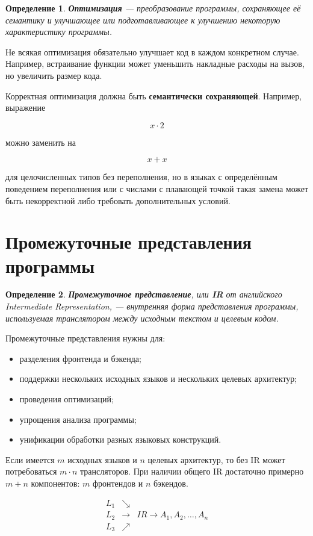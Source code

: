 \documentclass[12pt,a4paper]{article}
\newtheorem{definition}{Определение}
\begin{document}
\begin{definition}
\textbf{Оптимизация} --- преобразование программы, сохраняющее её семантику и улучшающее или подготавливающее к улучшению некоторую характеристику программы.
\end{definition}

Не всякая оптимизация обязательно улучшает код в каждом конкретном случае. Например, встраивание функции может уменьшить накладные расходы на вызов, но увеличить размер кода.

Корректная оптимизация должна быть \textbf{семантически сохраняющей}. Например, выражение

\[
x \cdot 2
\]

можно заменить на

\[
x + x
\]

для целочисленных типов без переполнения, но в языках с определённым поведением переполнения или с числами с плавающей точкой такая замена может быть некорректной либо требовать дополнительных условий.

\section{Промежуточные представления программы}

\begin{definition}
\textbf{Промежуточное представление}, или \textbf{IR} от английского \emph{Intermediate Representation}, --- внутренняя форма представления программы, используемая транслятором между исходным текстом и целевым кодом.
\end{definition}

Промежуточные представления нужны для:
\begin{itemize}
    \item разделения фронтенда и бэкенда;
    \item поддержки нескольких исходных языков и нескольких целевых архитектур;
    \item проведения оптимизаций;
    \item упрощения анализа программы;
    \item унификации обработки разных языковых конструкций.
\end{itemize}

Если имеется $m$ исходных языков и $n$ целевых архитектур, то без IR может потребоваться $m \cdot n$ трансляторов. При наличии общего IR достаточно примерно $m+n$ компонентов: $m$ фронтендов и $n$ бэкендов.

\[
\begin{array}{ccc}
L_1 & \searrow & \\
L_2 & \to & IR \to A_1,A_2,\ldots,A_n \\
L_3 & \nearrow &
\end{array}
\]
\end{document}
